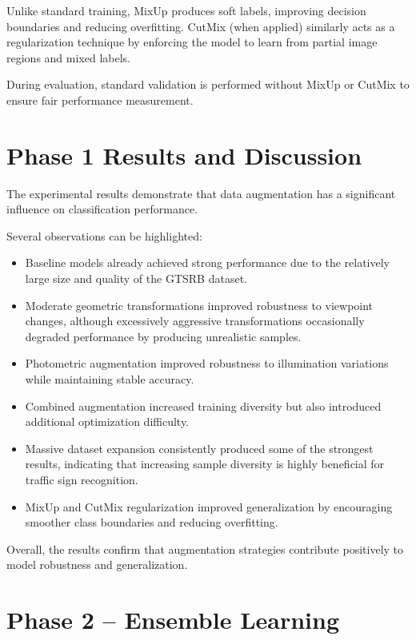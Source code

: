 \documentclass[conference,a4paper]{IEEEtran}
\begin{document}
Unlike standard training, MixUp produces soft labels, improving decision boundaries and reducing overfitting. CutMix (when applied) similarly acts as a regularization technique by enforcing the model to learn from partial image regions and mixed labels.

During evaluation, standard validation is performed without MixUp or CutMix to ensure fair performance measurement.

\section{Phase 1 Results and Discussion}

The experimental results demonstrate that data augmentation has a significant influence on classification performance.

Several observations can be highlighted:

\begin{itemize}
\item Baseline models already achieved strong performance due to the relatively large size and quality of the GTSRB dataset.

\item Moderate geometric transformations improved robustness to viewpoint changes, although excessively aggressive transformations occasionally degraded performance by producing unrealistic samples.

\item Photometric augmentation improved robustness to illumination variations while maintaining stable accuracy.

\item Combined augmentation increased training diversity but also introduced additional optimization difficulty.

\item Massive dataset expansion consistently produced some of the strongest results, indicating that increasing sample diversity is highly beneficial for traffic sign recognition.

\item MixUp and CutMix regularization improved generalization by encouraging smoother class boundaries and reducing overfitting.

\end{itemize}

Overall, the results confirm that augmentation strategies contribute positively to model robustness and generalization.

\section{Phase 2 – Ensemble Learning}
\end{document}
